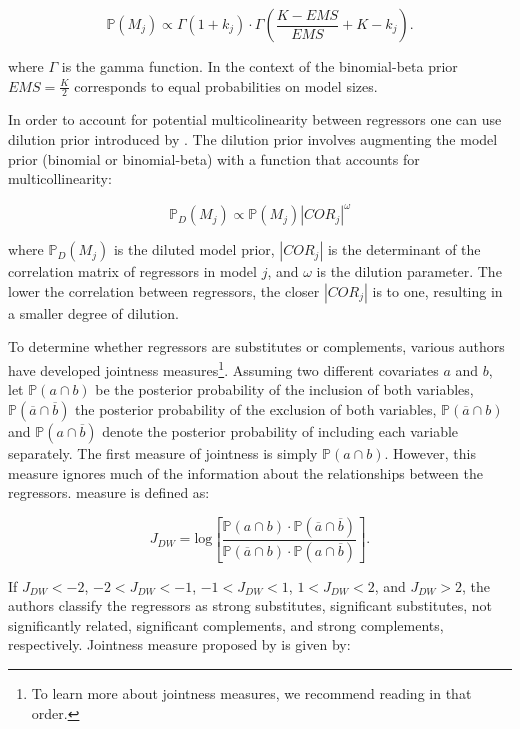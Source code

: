 \documentclass[a4paper]{article}
\begin{document}
\begin{equation}
    \mathbb{P}(M_{j}) \propto \Gamma(1+k_{j}) \cdot \Gamma(\frac{K-EMS}{EMS}+K-k_{j}).
\end{equation}

\noindent where $\Gamma$ is the gamma function.
In the context of the binomial-beta prior $EMS = \frac{K}{2}$ corresponds to equal probabilities on model sizes.

\indent In order to account for potential multicolinearity between regressors one can use dilution prior introduced by \citet{George+2010}.
The dilution prior involves augmenting the model prior (binomial or binomial-beta) with a function that accounts for multicollinearity:

\begin{equation}
    \mathbb{P}_{D}(M_{j}) \propto \mathbb{P}(M_{j})|COR_{j}|^{\omega}
\end{equation}

where $\mathbb{P}_{D}(M_{j})$ is the diluted model prior, $|COR_{j}|$ is the determinant of the correlation matrix of regressors in model $j$,
and $\omega$ is the dilution parameter.
The lower the correlation between regressors,
the closer $|COR_{j}|$ is to one, resulting in a smaller degree of dilution.

\indent To determine whether regressors are substitutes or complements,
various authors have developed jointness measures\footnote{
To learn more about jointness measures, we recommend reading \citet{Doppelhofer+2009, Ley+2007, Hofmarcher+2018} in that order.
}.
Assuming two different covariates $a$ and $b$,
let $\mathbb{P}(a\cap b)$ be the posterior probability of the inclusion of both variables,
$\mathbb{P}(\overline{a}\cap \overline{b})$ the posterior probability of the exclusion of both variables,
$\mathbb{P}(\overline{a}\cap b)$ and $\mathbb{P}(a\cap \overline{b})$ denote the posterior probability of including each variable separately.
The first measure of jointness is simply $\mathbb{P}(a\cap b)$.
However, this measure ignores much of the information about the relationships between the regressors.
\citet{Doppelhofer+2009} measure is defined as:

\begin{equation}
    J_{DW}=\text{log}\left[\frac{\mathbb{P}(a\cap b) \cdot \mathbb{P}(\overline{a}\cap \overline{b})}{\mathbb{P}(\overline{a}\cap b) \cdot \mathbb{P}(a\cap \overline{b})}\right].
\end{equation}

If $J_{DW} < -2$, $-2 < J_{DW} < -1$, $-1 < J_{DW} < 1$, $1 < J_{DW} < 2$, and $J_{DW} > 2$, the authors classify the regressors as strong substitutes, significant substitutes, not significantly related, significant complements, and strong complements, respectively.
Jointness measure proposed by \citet{Ley+2007} is given by:
\end{document}
